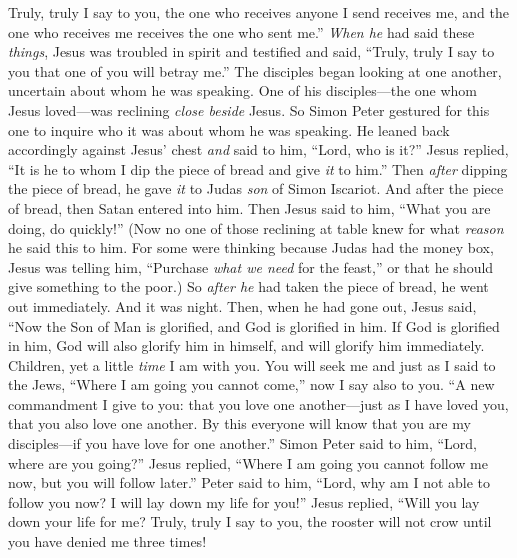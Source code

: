 \begin{biblechapter}
\verse Truly, truly I say to you, the one who receives anyone I send receives me, and the one who receives me receives the one who sent me.”
 \textit{When he} had said these \textit{things}, Jesus was troubled in spirit and testified and said, “Truly, truly I say to you that one of you will betray me.”
\verse The disciples began looking at one another, uncertain about whom he was speaking.
\verse One of his disciples—the one whom Jesus loved—was reclining \textit{close beside} Jesus.
\verse So Simon Peter gestured for this one to inquire who it was about whom he was speaking.
\verse He leaned back accordingly against Jesus’ chest \textit{and} said to him, “Lord, who is it?”
\verse Jesus replied, “It is he to whom I dip the piece of bread and give \textit{it} to him.” Then \textit{after} dipping the piece of bread, he gave \textit{it}﻿ to Judas \textit{son} of Simon Iscariot.
\verse And after the piece of bread, then Satan entered into him. Then Jesus said to him, “What you are doing, do quickly!”
\verse (Now no one of those reclining at table knew for what \textit{reason} he said this to him.
\verse For some were thinking because Judas had the money box, Jesus was telling him, “Purchase \textit{what we need} for the feast,” or that he should give something to the poor.)
\verse So \textit{after he} had taken the piece of bread, he went out immediately. And it was night.
 Then, when he had gone out, Jesus said, “Now the Son of Man is glorified, and God is glorified in him.
\verse If God is glorified in him, God will also glorify him in himself, and will glorify him immediately.
\verse Children, yet a little \textit{time} I am with you. You will seek me and just as I said to the Jews, “Where I am going you cannot come,” now I say also to you.
\verse “A new commandment I give to you: that you love one another—just as I have loved you, that you also love one another.
\verse By this everyone will know that you are my disciples—if you have love for one another.”
\verse Simon Peter said to him, “Lord, where are you going?” Jesus replied, “Where I am going you cannot follow me now, but you will follow later.”
\verse Peter said to him, “Lord, why am I not able to follow you now? I will lay down my life for you!”
\verse Jesus replied, “Will you lay down your life for me? Truly, truly I say to you, the rooster will not crow until you have denied me three times!
\end{biblechapter}

